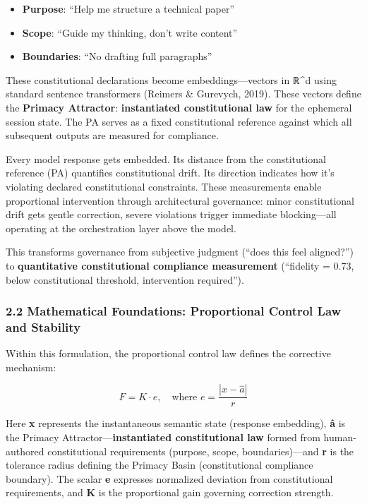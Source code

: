 \begin{itemize}
\tightlist
\item
  \textbf{Purpose}: ``Help me structure a technical paper''
\item
  \textbf{Scope}: ``Guide my thinking, don't write content''
\item
  \textbf{Boundaries}: ``No drafting full paragraphs''
\end{itemize}

These constitutional declarations become embeddings---vectors in ℝ\^{}d
using standard sentence transformers (Reimers \& Gurevych, 2019). These
vectors define the \textbf{Primacy Attractor}: \textbf{instantiated
constitutional law} for the ephemeral session state. The PA serves as a
fixed constitutional reference against which all subsequent outputs are
measured for compliance.

Every model response gets embedded. Its distance from the constitutional
reference (PA) quantifies constitutional drift. Its direction indicates
how it's violating declared constitutional constraints. These
measurements enable proportional intervention through architectural
governance: minor constitutional drift gets gentle correction, severe
violations trigger immediate blocking---all operating at the
orchestration layer above the model.

This transforms governance from subjective judgment (``does this feel
aligned?'') to \textbf{quantitative constitutional compliance
measurement} (``fidelity = 0.73, below constitutional threshold,
intervention required'').

\subsubsection{2.2 Mathematical Foundations: Proportional Control Law
and
Stability}\label{mathematical-foundations-proportional-control-law-and-stability}

Within this formulation, the proportional control law defines the
corrective mechanism:

\[F = K \cdot e, \quad \text{where } e = \frac{|x - \hat{a}|}{r}\]

Here \textbf{x} represents the instantaneous semantic state (response
embedding), \textbf{â} is the Primacy Attractor---\textbf{instantiated
constitutional law} formed from human-authored constitutional
requirements (purpose, scope, boundaries)---and \textbf{r} is the
tolerance radius defining the Primacy Basin (constitutional compliance
boundary). The scalar \textbf{e} expresses normalized deviation from
constitutional requirements, and \textbf{K} is the proportional gain
governing correction strength.

